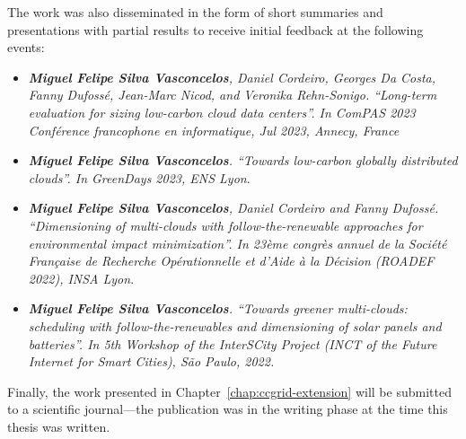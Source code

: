 The work was also disseminated in the form of short summaries and presentations with partial results to receive initial feedback at the following events:

\begin{itemize}

\item \textit{\textbf{Miguel Felipe Silva Vasconcelos}, Daniel Cordeiro, Georges Da Costa, Fanny Dufossé, Jean-Marc Nicod, and Veronika Rehn-Sonigo. ``Long-term evaluation for sizing low-carbon cloud data centers''. In ComPAS 2023 Conférence francophone en informatique, Jul 2023, Annecy, France}

\item  \textit{\textbf{Miguel Felipe Silva Vasconcelos}. ``Towards low-carbon globally distributed clouds''. In GreenDays 2023, ENS Lyon}.

\item  \textit{\textbf{Miguel Felipe Silva Vasconcelos}, Daniel Cordeiro and Fanny Dufossé. ``Dimensioning of multi-clouds with follow-the-renewable approaches for environmental impact minimization''. In 23ème congrès annuel de la Société Française de Recherche Opérationnelle et d’Aide à la Décision (ROADEF 2022), INSA Lyon}.

\item  \textit{\textbf{Miguel Felipe Silva Vasconcelos}. ``Towards greener multi-clouds: scheduling with follow-the-renewables and dimensioning of solar panels and batteries''. In 5th Workshop of the InterSCity Project (INCT of the Future Internet for Smart Cities), São Paulo, 2022.}

\end{itemize}

Finally, the work presented in Chapter~\ref{chap:ccgrid-extension} will be submitted to a scientific journal---the publication was in the writing phase at the time this thesis was written.